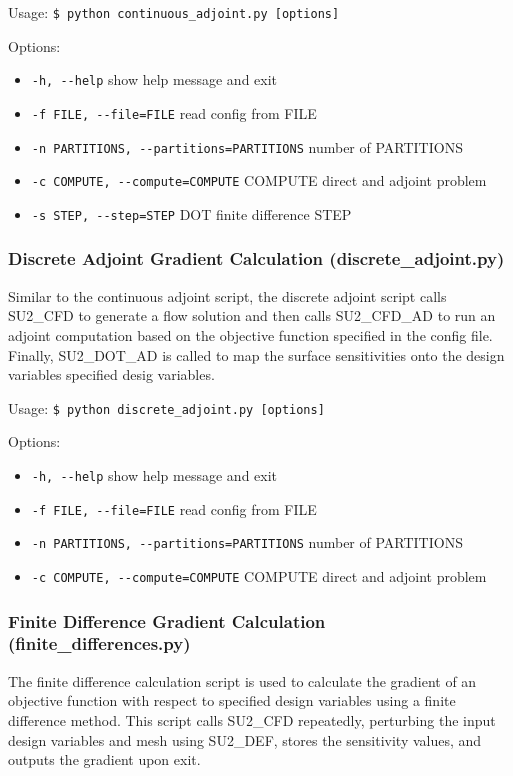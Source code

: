 \documentclass{article}
\begin{document}
Usage: \verb|$ python continuous_adjoint.py [options]|

Options:

\begin{itemize}
    \item \verb|-h, --help| show help message and exit
    \item \verb|-f FILE, --file=FILE| read config from FILE
    \item \verb|-n PARTITIONS, --partitions=PARTITIONS| number of PARTITIONS
    \item \verb|-c COMPUTE, --compute=COMPUTE| COMPUTE direct and adjoint problem
    \item \verb|-s STEP, --step=STEP| DOT finite difference STEP
\end{itemize}
    

\subsubsection{Discrete Adjoint Gradient Calculation (discrete\_adjoint.py)}

Similar to the continuous adjoint script, the discrete adjoint script calls SU2\_CFD to generate a flow solution and then calls SU2\_CFD\_AD to run an adjoint computation based on the objective function specified in the config file. Finally, SU2\_DOT\_AD is called to map the surface sensitivities onto the design variables specified desig variables.

Usage: \verb|$ python discrete_adjoint.py [options]|

Options:
\begin{itemize}
    \item \verb|-h, --help| show help message and exit
    \item \verb|-f FILE, --file=FILE| read config from FILE
    \item \verb|-n PARTITIONS, --partitions=PARTITIONS| number of PARTITIONS
    \item \verb|-c COMPUTE, --compute=COMPUTE| COMPUTE direct and adjoint problem
\end{itemize}
    
\subsubsection{Finite Difference Gradient Calculation (finite\_differences.py)}

The finite difference calculation script is used to calculate the gradient of an objective function with respect to specified design variables using a finite difference method. This script calls SU2\_CFD repeatedly, perturbing the input design variables and mesh using SU2\_DEF, stores the sensitivity values, and outputs the gradient upon exit.
\end{document}
